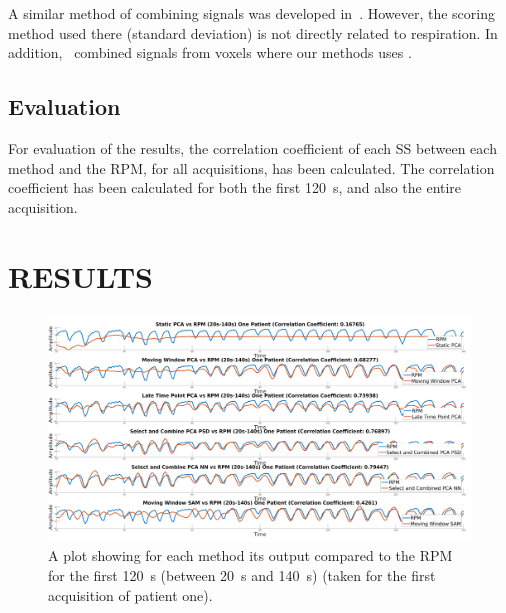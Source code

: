             A similar method of combining signals was developed in~\cite{Kesner2010AMethods}. However, the scoring method used there (standard deviation) is not directly related to respiration. In addition,~\cite{Kesner2010AMethods} combined signals from voxels where our methods uses .
        
            
    \subsection{Evaluation} \label{sec:evaluation}
        For evaluation of the results, the correlation coefficient of each \gls{SS} between each method and the \gls{RPM}, for all acquisitions, has been calculated. The correlation coefficient has been calculated for both the first \SI{120}{\second}, and also the entire acquisition.
    
            
\section{RESULTS} \label{sec:results}
    \begin{figure}
        
        \centering
        
        \includegraphics[width=1.0\linewidth]{figures/patient_one_output.png}
        
        
        \captionsetup{singlelinecheck=false, justification=centering}
        \caption{
        A plot showing for each method its output compared to the \gls{RPM} for the first \SI{120}{\second} (between \SI{20}{\second} and \SI{140}{\second}) (taken for the first acquisition of patient one).}
        
        \label{fig:patient_one_output}
        
    \end{figure}
    
